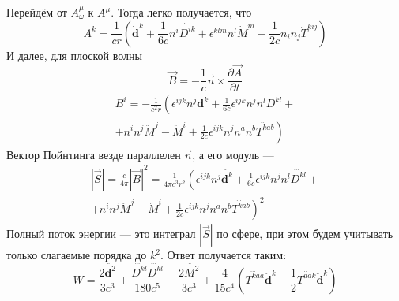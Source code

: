 \documentclass{article}
\begin{document}
Перейдём от $A^{\mu}_{\omega}$ к $A^{\mu}$.
Тогда легко получается, что
\begin{equation}
	A^{k} = \frac{1}{cr}\left(\dot{\mathbf{d}}^k + \frac{1}{6c}n^i \ddot{D^{ik}} 
								+ \epsilon^{klm}n^l\dot{M}^m
								+ \frac{1}{2c}n_i n_j \ddot{T}^{kij} 
								\right)
\end{equation}
И далее, для плоской волны 
\begin{equation}
	\vec{B} = -\frac{1}{c} \vec{n} \times \frac{\partial \vec{A}}{\partial t}
\end{equation}
\begin{multline}
	B^i = -\frac{1}{c^2r} \left(\epsilon^{ijk}n^j\ddot{\mathbf{d}^k} \right. +
						\frac{1}{6c}\epsilon^{ijk}n^jn^l\dddot{D^{kl}} + \\
						+\left. n^i n^j \ddot{M}^j - \ddot{M}^i + 
						\frac{1}{2c}\epsilon^{ijk}n^jn^a n^b \dddot{T^{kab}} \right)	
\end{multline}
Вектор Пойнтинга везде параллелен $\vec{n}$, а его модуль ---
\begin{multline}
	|\vec{S}| = \frac{c}{4\pi} |\vec{B}|^2 = \frac{1}{4\pi c^3 r^2}
				\left(\epsilon^{ijk}n^j\ddot{\mathbf{d}^k} \right. +
					\frac{1}{6c}\epsilon^{ijk}n^jn^l\dddot{D^{kl}} + \\
					+n^i n^j \ddot{M}^j - \ddot{M}^i + 
					\left.\frac{1}{2c}\epsilon^{ijk}n^jn^a n^b\dddot{T^{kab}}\right)^2	
\end{multline}
Полный поток энергии --- это интеграл $|\vec{S}|$ по сфере, при этом будем учитывать только
слагаемые порядка до $k^2$.
Ответ получается таким:
\begin{equation}
	W = \frac{2\ddot{\mathbf{d}^2}}{3c^3} + 
			\frac{\dddot{D^{kl}}\dddot{D^{kl}}}{180c^5} + \frac{2\ddot{M^2}}{3c^3} + 
			\frac{4}{15c^4} \left( \dddot{T^{kaa}} \ddot{\mathbf{d}}^k -
						\frac{1}{2} \dddot{T^{aak}}\ddot{\mathbf{d}}^k \right )
\end{equation}
\end{document}

